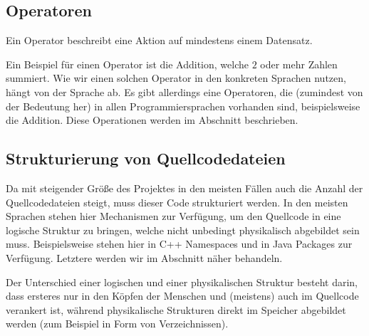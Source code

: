 \subsection{Operatoren} \functionalMark \imperativeMark \oopMark

	Ein Operator beschreibt eine Aktion auf mindestens einem Datensatz.
	
	Ein Beispiel für einen Operator ist die Addition, welche $ 2 $ oder mehr Zahlen summiert. Wie wir einen solchen Operator in den konkreten Sprachen nutzen, hängt von der Sprache ab. Es gibt allerdings eine Operatoren, die (zumindest von der Bedeutung her) in allen Programmiersprachen vorhanden sind, beispielsweise die Addition. Diese Operationen werden im Abschnitt  beschrieben.

\subsection{Strukturierung von Quellcodedateien} \functionalMark \imperativeMark \oopMark
	
	Da mit steigender Größe des Projektes in den meisten Fällen auch die Anzahl der Quellcodedateien steigt, muss dieser Code strukturiert werden. In den meisten Sprachen stehen hier Mechanismen zur Verfügung, um den Quellcode in eine logische Struktur zu bringen, welche nicht unbedingt physikalisch abgebildet sein muss. Beispielsweise stehen hier in C++ Namespaces und in Java Packages zur Verfügung. Letztere werden wir im Abschnitt  näher behandeln.
	
	Der Unterschied einer logischen und einer physikalischen Struktur besteht darin, dass ersteres nur in den Köpfen der Menschen und (meistens) auch im Quellcode verankert ist, während physikalische Strukturen direkt im Speicher abgebildet werden (zum Beispiel in Form von Verzeichnissen).
